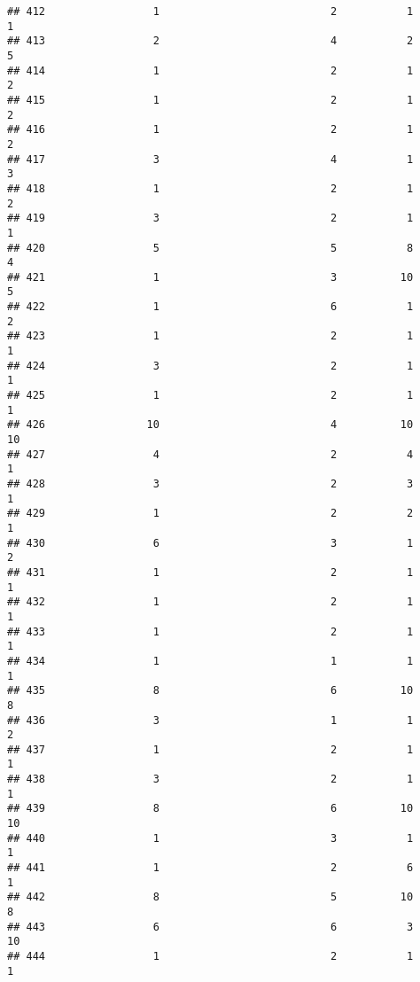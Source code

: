 \documentclass[
]{article}
\begin{document}
\begin{verbatim}
## 412                 1                           2           1               1
## 413                 2                           4           2               5
## 414                 1                           2           1               2
## 415                 1                           2           1               2
## 416                 1                           2           1               2
## 417                 3                           4           1               3
## 418                 1                           2           1               2
## 419                 3                           2           1               1
## 420                 5                           5           8               4
## 421                 1                           3          10               5
## 422                 1                           6           1               2
## 423                 1                           2           1               1
## 424                 3                           2           1               1
## 425                 1                           2           1               1
## 426                10                           4          10              10
## 427                 4                           2           4               1
## 428                 3                           2           3               1
## 429                 1                           2           2               1
## 430                 6                           3           1               2
## 431                 1                           2           1               1
## 432                 1                           2           1               1
## 433                 1                           2           1               1
## 434                 1                           1           1               1
## 435                 8                           6          10               8
## 436                 3                           1           1               2
## 437                 1                           2           1               1
## 438                 3                           2           1               1
## 439                 8                           6          10              10
## 440                 1                           3           1               1
## 441                 1                           2           6               1
## 442                 8                           5          10               8
## 443                 6                           6           3              10
## 444                 1                           2           1               1

\end{verbatim}
\end{document}
